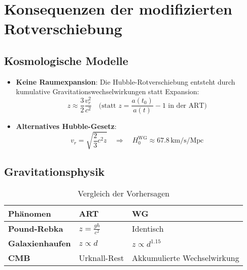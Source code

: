 \newpage
\section{Konsequenzen der modifizierten Rotverschiebung}

\subsection{Kosmologische Modelle}
\begin{itemize}
\item \textbf{Keine Raumexpansion}: Die Hubble-Rotverschiebung entsteht durch kumulative Gravitationswechselwirkungen statt Expansion:
  \begin{equation}
  z \approx \frac{3}{2}\frac{v_r^2}{c^2} \quad \text{(statt } z = \frac{a(t_0)}{a(t)}-1 \text{ in der ART)}
  \end{equation}

\item \textbf{Alternatives Hubble-Gesetz}:
  \begin{equation}
  v_r = \sqrt{\frac{2}{3}c^2 z} \quad \Rightarrow \quad H_0^\text{WG} \approx 67.8\,\text{km/s/Mpc}
  \end{equation}
\end{itemize}

\subsection{Gravitationsphysik}
\begin{table}[h]
\centering
\caption{Vergleich der Vorhersagen}
\begin{tabular}{lll}
\hline
Phänomen & ART & WG \\
\hline
\textbf{Pound-Rebka} & $z=\frac{gh}{c^2}$ & Identisch \\
\textbf{Galaxienhaufen} & $z \propto d$ & $z \propto d^{1.15}$ \\
\textbf{CMB} & Urknall-Rest & Akkumulierte Wechselwirkung \\
\hline
\end{tabular}
\end{table}

